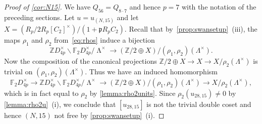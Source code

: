 \documentclass[10pt,a4paper]{amsart}
\newcommand{\F}{\mathbb{F}}
\DeclareMathOperator{\LL}{\Lambda}
\newcommand{\Z}{\mathbb{Z}}
\begin{document}
\begin{proof}[Proof of \cref{cor:N15}]
We have $Q_{56} = Q_{8 \cdot 7}$ and hence $p = 7$ with the notation of the preceding sections.
Let $u = u_{(N, 15)}$
and let $X = {(R_p/2R_p[C_2]^\times)}/({1+\mathfrak{p}R_pC_2})$.
Recall that by~\cref{prop:swansetup}~(iii), the maps $\rho_1$ and $\rho_2$ from~\cref{eq:rhos} induce a bijection
\[
\Z D_{4p}^\times \backslash \F_2 D_{4p}^\times /{\LL^\times}
\longrightarrow (\Z/2 \oplus X )/ (\rho_1,\rho_2)(\Lambda^\times).
\]
Now the composition of the canonical projections
$\Z/2 \oplus X \to
X
\to X/\rho_2(\Lambda^\times)
$ is trivial on $(\rho_1,\rho_2)(\Lambda^\times)$.
Thus we have an induced homomorphism
\[ \F_2 D_{4p}^\times \to \Z D_{4p}^\times \backslash \F_2 D_{4p}^\times /{\LL^\times } \to (\Z/2 \oplus X)/(\rho_1, \rho_2)(\Lambda^\times) \to X/\rho_2(\Lambda^\times),\]
which is in fact equal to $\rho_2$ by \cref{lemma:rho2units}.
Since $\rho_2(u_{28, 15}) \neq 0$ by \cref{lemma:rho2u}~(i), we conclude that $[u_{28, 15}]$ is not the trivial double coset and hence $(N, 15)$ not free by \cref{prop:swansetup}~(i).
\end{proof}
\end{document}
